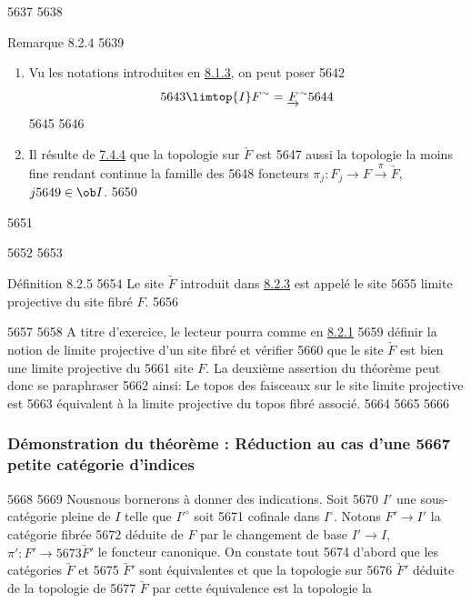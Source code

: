   5637	
  5638	\begin{enonce*}[remark]{Remarque 8.2.4}
  5639	\begin{enumerate}
  5640	\renewcommand{\labelenumi}{\theenumi)}
  5641	\item Vu les notations introduites en \hyperref[VI.subsubsec8.1.3]{8.1.3}, on peut poser
  5642	$$
  5643	\limtop{I} F^{\sim} = \underrightarrow{F}^{\sim}
  5644	$$
  5645	
  5646	\item Il résulte de \hyperref[VI.prop7.4.4]{7.4.4} que la topologie sur $\underrightarrow{F}$ est
  5647	  aussi la topologie la moins fine rendant continue la famille des
  5648	  foncteurs $\pi_j : F_j \to F \xrightarrow{\pi} \underrightarrow{F}$, $j
  5649	  \in \ob I$.
  5650	\end{enumerate}
  5651	\end{enonce*}
  5652	
  5653	\begin{enonce*}{Définition 8.2.5}
  5654	Le site $\underrightarrow{F}$ introduit dans \hyperref[VI.thm8.2.3]{8.2.3} est appelé le site
  5655	limite projective du site fibré $F$.
  5656	\end{enonce*}
  5657	
  5658	A titre d'exercice, le lecteur pourra comme en \hyperref[VI.lem8.2.1]{8.2.1}
  5659	définir la notion de limite projective d'un site fibré et vérifier
  5660	que le site $\underrightarrow{F}$ est bien une limite projective du
  5661	site $F$. La deuxième assertion du théorème peut donc se paraphraser
  5662	ainsi: Le topos des faisceaux sur le site limite projective est
  5663	équivalent à la limite projective du topos fibré associé.
  5664	
  5665	\setcounter{subsubsection}{5}
  5666	\subsubsection{Démonstration du théorème : Réduction au cas d'une
  5667	  petite catégorie d'indices}
  5668	
  5669	Nous\pageoriginale nous bornerons à donner des indications. Soit
  5670	$I'$ une sous-catégorie pleine de $I$ telle que ${I'}^{\circ}$ soit
  5671	cofinale dans $I^{\circ}$. Notons $F'\to I'$ la catégorie fibrée
  5672	déduite de $F$ par le changement de base $I'\to I$, $\pi': F'\to
  5673	\underrightarrow{F}'$ le foncteur canonique. On constate tout
  5674	d'abord que les catégories $\underrightarrow{F}$ et
  5675	$\underrightarrow{F}'$ sont équivalentes et que la topologie sur
  5676	$\underrightarrow{F}'$ déduite de la topologie de
  5677	$\underrightarrow{F}$ par cette équivalence est la topologie la
